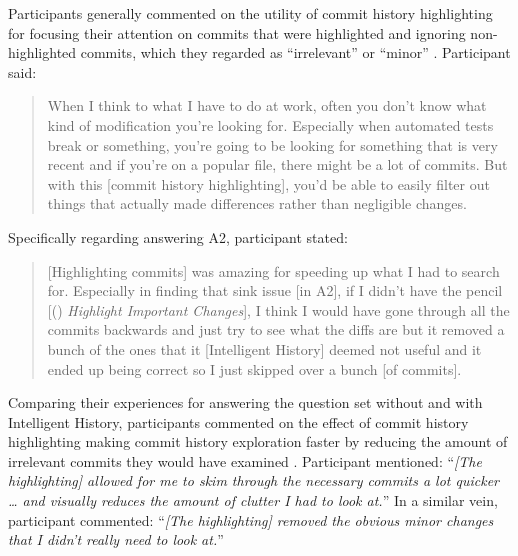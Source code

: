 Participants generally commented on the utility of commit history highlighting for focusing their attention on commits that were highlighted 
and ignoring non-highlighted commits, which they regarded as ``irrelevant'' or ``minor'' .
Participant  said:

\begin{quote}
  When I think to what I have to do at work, 
  often you don’t know what kind of modification you’re looking for. 
  Especially when automated tests break or something, 
  you’re going to be looking for something that is very recent and if you’re on a popular file, 
  there might be a lot of commits. 
  But with this [commit history highlighting], 
  you’d be able to easily filter out things that actually made differences rather than negligible changes.
\end{quote}

Specifically regarding answering A2, participant  stated:

\begin{quote}
  [Highlighting commits] was amazing for speeding up what I had to search for. 
  Especially in finding that sink issue [in A2], if I didn’t have the pencil 
  [() \textit{Highlight Important Changes}], 
  I think I would have gone through all the commits backwards and just try to see what the diffs are 
  but it removed a bunch of the ones that it [Intelligent History] deemed not useful 
  and it ended up being correct so I just skipped over a bunch [of commits].
\end{quote}

Comparing their experiences for answering the question set without and with Intelligent History, 
participants commented on the effect of commit history highlighting making commit history exploration faster by reducing the amount of irrelevant commits they would have examined .
Participant  mentioned: 
``\textit{[The highlighting] allowed for me to skim through the necessary commits a lot quicker \dots 
and visually reduces the amount of clutter I had to look at.}''
In a similar vein, participant  commented:
``\textit{[The highlighting] removed the obvious minor changes that I didn’t really need to look at.}''

